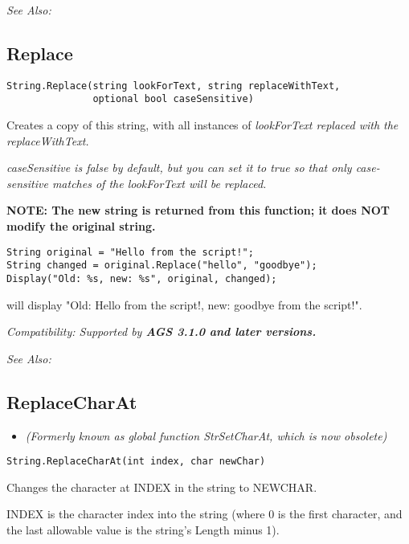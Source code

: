 \it{See Also:} 


\subsection{Replace}\label{String.Replace}%

\begin{verbatim}
String.Replace(string lookForText, string replaceWithText,
               optional bool caseSensitive)
\end{verbatim}
Creates a copy of this string, with all instances of \it{lookForText} replaced
with the \it{replaceWithText}.

\it{caseSensitive} is \it{false} by default, but you can set it to true so that only
case-sensitive matches of the \it{lookForText} will be replaced.

\bf{NOTE:} The new string is returned from this function; it
does \bf{NOT} modify the original string.

\begin{verbatim}
String original = "Hello from the script!";
String changed = original.Replace("hello", "goodbye");
Display("Old: %s, new: %s", original, changed);
\end{verbatim}
will display "Old: Hello from the script!, new: goodbye from the script!".

\it{Compatibility:} Supported by \bf{AGS 3.1.0} and later versions.

\it{See Also:} 


\subsection{ReplaceCharAt}\label{String.ReplaceCharAt}%

\begin{itemize}
\item \it{(Formerly known as global function StrSetCharAt, which is now obsolete)}
\end{itemize}

\begin{verbatim}
String.ReplaceCharAt(int index, char newChar)
\end{verbatim}
Changes the character at INDEX in the string to NEWCHAR.

INDEX is the character index into the string (where 0 is the first character,
and the last allowable value is the string's Length minus 1).

